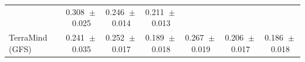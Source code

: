 \begin{tabular}{lcccccc}
& 0.308%
${}\pm{}$0.025%
& 0.246%
${}\pm{}$0.014%
& 0.211%
${}\pm{}$0.013%
\\
TerraMind (GFS)
& 0.241%
${}\pm{}$0.035%
& 0.252%
${}\pm{}$0.017%
& 0.189%
${}\pm{}$0.018%
& 0.267%
${}\pm{}$0.019%
& 0.206%
${}\pm{}$0.017%
& 0.186%
${}\pm{}$0.018%
\\
\bottomrule
\end{tabular}
